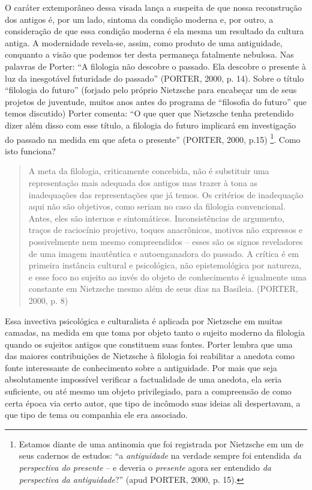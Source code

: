 \documentclass[
	12pt,				%
	openright,			%
	oneside,			%
	a4paper,			%
	english,			%
	french,				%
	spanish,			%
	brazil				%
	]{abntex2}
\begin{document}
O caráter extemporâneo dessa visada lança a suspeita de que nossa reconstrução dos antigos é, por um lado, sintoma da condição moderna e, por outro, a consideração de que essa condição moderna é ela mesma um resultado da cultura antiga. A modernidade revela-se, assim, como produto de uma antiguidade, conquanto a visão que podemos ter desta permaneça fatalmente  nebulosa. Nas palavras de Porter: “A filologia não descobre o passado. Ela descobre o presente à luz da inesgotável futuridade do passado” (PORTER, 2000, p. 14). Sobre o título “filologia do futuro” (forjado pelo próprio Nietzsche para encabeçar um de seus projetos de juventude, muitos anos antes do programa de “filosofia do futuro” que temos discutido) Porter comenta: “O que quer que Nietzsche tenha pretendido dizer além disso com esse título, a filologia do futuro implicará em investigação do passado na medida em que afeta o presente” (PORTER, 2000, p.15)
\footnote{Estamos diante de uma antinomia que foi registrada por Nietzsche em um de seus cadernos de estudos: “a \textit{antiguidade} na verdade sempre foi entendida \textit{da perspectiva do presente} – e deveria o \textit{presente} agora ser entendido \textit{da perspectiva da antiguidade}?” (apud PORTER, 2000, p. 15).}. Como isto funciona?

\begin{quotation}
A meta da filologia, criticamente concebida, não é substituir uma representação mais adequada dos antigos mas trazer à tona as inadequações das representações que já temos. Os critérios de inadequação aqui não são objetivos, como seriam no caso da filologia convencional. Antes, eles são internos e sintomáticos. Inconsistências de argumento, traços de raciocínio projetivo, toques anacrônicos, motivos não expressos e possivelmente nem mesmo compreendidos – esses são os signos reveladores de uma imagem inautêntica e autoenganadora do passado. A crítica é em primeira instância cultural e psicológica, não epistemológica por natureza, e esse foco no sujeito ao invés do objeto de conhecimento é igualmente uma constante em Nietzsche mesmo além de seus dias na Basileia. (PORTER, 2000, p. 8)
\end{quotation}

Essa invectiva psicológica e culturalista é aplicada por Nietzsche em muitas camadas, na medida em que toma por objeto tanto o sujeito moderno da filologia quando os sujeitos antigos que constituem suas fontes. Porter lembra que uma das maiores contribuições de Nietzsche à filologia foi reabilitar a anedota como fonte interessante de conhecimento sobre a antiguidade. Por mais que seja absolutamente impossível verificar a factualidade de uma anedota, ela seria suficiente, ou até mesmo um objeto privilegiado, para a compreensão de como certa época via certo autor, que tipo de incômodo suas ideias ali despertavam, a que tipo de tema ou companhia ele era associado. 
\end{document}
